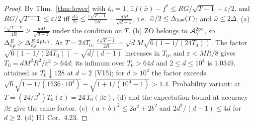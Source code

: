 \documentclass[11pt,a4paper]{article}
\numberwithin{equation}{section}
\theoremstyle{definition}
\theoremstyle{remark}
\newcommand{\E}{\mathbb E}\newcommand{\R}{\mathbb R}\newcommand{\Z}{\mathbb Z}\newcommand{\Prob}{\mathbb P}
\newcommand{\wbar}{\bar\omega}\newcommand{\Atwo}{\cA^{\rm 2pt}_\gamma}
\begin{document}
\begin{proof}
By Thm.~\ref{thm:lower} with $t_0=1$, $\E f(\bar x)-f^*\le RG/\sqrt{T-1}+\varepsilon/2$, and $RG/\sqrt{T-1}\le\varepsilon/2$ iff $\frac{d\wbar}{2\gamma}\le\frac{\varepsilon\sqrt{T-1}}{2R}-\frac{dM}{\sqrt{d-1}}$, i.e.\ $\wbar/2\le\Dlow(T)$; and $\wbar\le2\Delta$. (a) $\frac{\varepsilon\sqrt{T-1}}{4R}\ge\frac{dM}{\sqrt{d-1}}$ under the condition on $T$. (b) ZO belongs to $\Atwo$, so $\Delta_{\rm cp}^E\ge\Delta_{\rm cp}^{E,\mathrm{2pt},\gamma}$. At $T=24T_0$, $\frac{\varepsilon\sqrt{T-1}}{2R}=\sqrt dM\sqrt{6(1-1/(24T_0))}$. The factor $\sqrt{6(1-1/(24T_0))}-\sqrt{d/(d-1)}$ increases in $T_0$, and $\varepsilon<MR/8$ gives $T_0=dM^2R^2/\varepsilon^2>64d$; its infimum over $T_0>64d$ and $2\le d\le10^4$ is $1.0349$, attained as $T_0\downarrow128$ at $d=2$ (V15); for $d>10^4$ the factor exceeds $\sqrt6\sqrt{1-1/(1536\cdot10^4)}-\sqrt{1+1/(10^4-1)}>1.4$. Probability variant: at $T=(24/\beta^2)T_0(\varepsilon)=24\,T_0(\beta\varepsilon)$, (d) and the expectation bound at accuracy $\beta\varepsilon$ give the same factor. (c) $(a+b)^2\le2a^2+2b^2$ and $2d^2/(d-1)\le4d$ for $d\ge2$. (d) H1 Cor.~4.23.
\end{proof}
\end{document}
